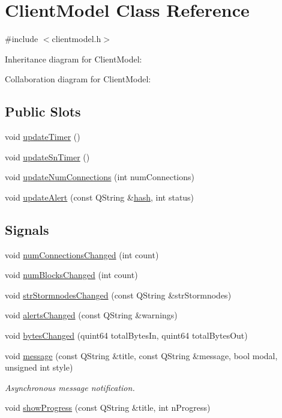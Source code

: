 \hypertarget{class_client_model}{}\section{Client\+Model Class Reference}
\label{class_client_model}


{\ttfamily \#include $<$clientmodel.\+h$>$}



Inheritance diagram for Client\+Model\+:


Collaboration diagram for Client\+Model\+:
\subsection*{Public Slots}
\begin{DoxyCompactItemize}
\item 
void \hyperlink{class_client_model_a82d434ebd032c00736e043ce2d36ac5e}{update\+Timer} ()
\item 
void \hyperlink{class_client_model_a52aad7741f3c1d1fb4f6177fbf2ae45a}{update\+Sn\+Timer} ()
\item 
void \hyperlink{class_client_model_a75f5a1a83e65aeb8fa01140584904967}{update\+Num\+Connections} (int num\+Connections)
\item 
void \hyperlink{class_client_model_a16758b18ded91ceba202d6023cad4b51}{update\+Alert} (const Q\+String \&\hyperlink{cache_8cc_a11ecb029164e055f28f4123ce3748862}{hash}, int status)
\end{DoxyCompactItemize}
\subsection*{Signals}
\begin{DoxyCompactItemize}
\item 
void \hyperlink{class_client_model_a8eea0203366271384b0bf62f1f39a56c}{num\+Connections\+Changed} (int count)
\item 
void \hyperlink{class_client_model_a649c53bba0c617d026cdcd22c243fa26}{num\+Blocks\+Changed} (int count)
\item 
void \hyperlink{class_client_model_a02aa81bb6710add3a3e4ec2ac88616c6}{str\+Stormnodes\+Changed} (const Q\+String \&str\+Stormnodes)
\item 
void \hyperlink{class_client_model_ae40a55475e8a39d928ce861e67f5497f}{alerts\+Changed} (const Q\+String \&warnings)
\item 
void \hyperlink{class_client_model_a06dd7e0e518b70e73684ca679bdf93b5}{bytes\+Changed} (quint64 total\+Bytes\+In, quint64 total\+Bytes\+Out)
\item 
void \hyperlink{class_client_model_a67d8c0971df370d8098960df3d51a645}{message} (const Q\+String \&title, const Q\+String \&message, bool modal, unsigned int style)
\begin{DoxyCompactList}\small\item\em Asynchronous message notification. \end{DoxyCompactList}\item 
void \hyperlink{class_client_model_a0b0ff10589ec0fd323251be7aa0fa6a2}{show\+Progress} (const Q\+String \&title, int n\+Progress)
\end{DoxyCompactItemize}
